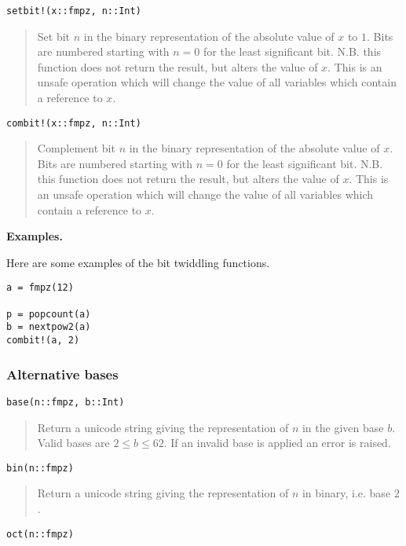 \documentclass[a4paper,10pt]{article}
\newcommand{\desc}[1]{\vspace{-3mm}\begin{quote}#1\end{quote}}
\begin{document}
{{\begin{lstlisting}
setbit!(x::fmpz, n::Int)
\end{lstlisting}

\desc{Set bit $n$ in the binary representation of the absolute value of $x$ to $1$. Bits
are numbered starting with $n = 0$ for the least significant bit. N.B. this function does
not return the result, but alters the value of $x$. This is an unsafe operation which will
change the value of all variables which contain a reference to $x$.}

\begin{lstlisting}
combit!(x::fmpz, n::Int)
\end{lstlisting}

\desc{Complement bit $n$ in the binary representation of the absolute value of $x$. Bits
are numbered starting with $n = 0$ for the least significant bit. N.B. this function does
not return the result, but alters the value of $x$. This is an unsafe operation which will
change the value of all variables which contain a reference to $x$.}

\textbf{Examples.}

Here are some examples of the bit twiddling functions.

\begin{lstlisting}
a = fmpz(12)

p = popcount(a)
b = nextpow2(a)
combit!(a, 2)
\end{lstlisting}

\subsubsection{Alternative bases}

\begin{lstlisting}
base(n::fmpz, b::Int)
\end{lstlisting}

\desc{Return a unicode string giving the representation of $n$ in the given base $b$. Valid
bases are $2 \leq b \leq 62$. If an invalid base is applied an error is raised.}

\begin{lstlisting}
bin(n::fmpz)
\end{lstlisting}

\desc{Return a unicode string giving the representation of $n$ in binary, i.e. base $2$.}

\begin{lstlisting}
oct(n::fmpz)
\end{lstlisting}

}}
\end{document}
